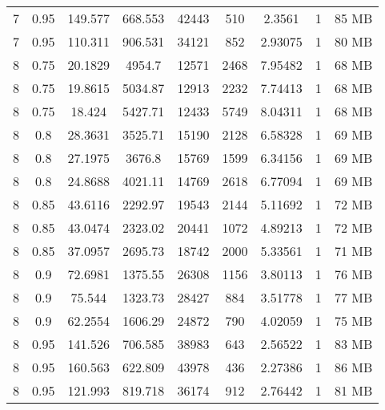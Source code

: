 \begin{longtable}{c|c|c|c|c|c|c|c|c}
  7   &  0.95  &  149.577  &  668.553  &  42443  &  510   &  2.3561   &  1  &  85  MB \\
  7   &  0.95  &  110.311  &  906.531  &  34121  &  852   &  2.93075  &  1  &  80  MB \\
  \hline
  8   &  0.75  &  20.1829  &  4954.7   &  12571  &  2468  &  7.95482  &  1  &  68  MB \\
  8   &  0.75  &  19.8615  &  5034.87  &  12913  &  2232  &  7.74413  &  1  &  68  MB \\
  8   &  0.75  &  18.424   &  5427.71  &  12433  &  5749  &  8.04311  &  1  &  68  MB \\
  \hline
  8   &  0.8   &  28.3631  &  3525.71  &  15190  &  2128  &  6.58328  &  1  &  69  MB \\
  8   &  0.8   &  27.1975  &  3676.8   &  15769  &  1599  &  6.34156  &  1  &  69  MB \\
  8   &  0.8   &  24.8688  &  4021.11  &  14769  &  2618  &  6.77094  &  1  &  69  MB \\
  \hline
  8   &  0.85  &  43.6116  &  2292.97  &  19543  &  2144  &  5.11692  &  1  &  72  MB \\
  8   &  0.85  &  43.0474  &  2323.02  &  20441  &  1072  &  4.89213  &  1  &  72  MB \\
  8   &  0.85  &  37.0957  &  2695.73  &  18742  &  2000  &  5.33561  &  1  &  71  MB \\
  \hline
  8   &  0.9   &  72.6981  &  1375.55  &  26308  &  1156  &  3.80113  &  1  &  76  MB \\
  8   &  0.9   &  75.544   &  1323.73  &  28427  &  884   &  3.51778  &  1  &  77  MB \\
  8   &  0.9   &  62.2554  &  1606.29  &  24872  &  790   &  4.02059  &  1  &  75  MB \\
  \hline
  8   &  0.95  &  141.526  &  706.585  &  38983  &  643   &  2.56522  &  1  &  83  MB \\
  8   &  0.95  &  160.563  &  622.809  &  43978  &  436   &  2.27386  &  1  &  86  MB \\
  8   &  0.95  &  121.993  &  819.718  &  36174  &  912   &  2.76442  &  1  &  81  MB \\
\end{longtable}
\endgroup
